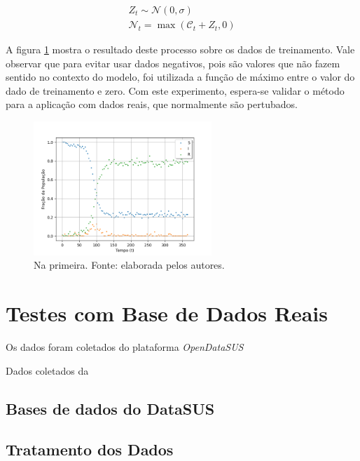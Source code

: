 \begin{eqnarray}\label{eq:ruido-gaussiano}
    Z_t \sim \mathcal{N}(0, \sigma) \\
    \mathcal{N}_t = \max(\mathcal{C}_t + Z_t, 0)  
\end{eqnarray}

A figura \ref{fig:dados-comruido} mostra o resultado deste processo sobre os dados
de treinamento. Vale observar que para evitar usar dados negativos, pois são valores
que não fazem sentido no contexto do modelo, foi utilizada a função de máximo
entre o valor do dado de treinamento e zero.
Com este experimento, espera-se validar o método para a aplicação com dados reais,
que normalmente são pertubados. 

\begin{figure}[htpb]
\centering
\includegraphics[width=0.6\textwidth]{figuras/runge-kutta-compartiments-data-sir-noisy.png}
\caption{Na primeira. Fonte: elaborada pelos autores.}
\label{fig:dados-comruido}
\end{figure}


\section{Testes com Base de Dados Reais}

Os dados foram coletados do plataforma \textit{OpenDataSUS} \cite{opendatasus}

Dados coletados da \cite{flunet}

\subsection{Bases de dados do DataSUS}

\subsection{Tratamento dos Dados}

